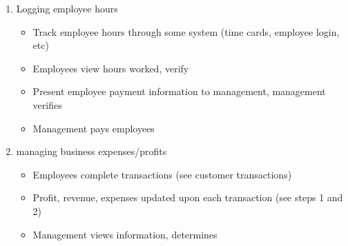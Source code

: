 \documentclass{letter}
\begin{document}
\begin{enumerate}
\begin{itemize}
\begin{itemize}
		\end{itemize}
		\item Logging employee hours
		\begin{itemize}
			\item Track employee hours through some system (time cards, employee login, etc)
			\item Employees view hours worked, verify
			\item Present employee payment information to management, management verifies
			\item Management pays employees
		\end{itemize}
		\item managing business expenses/profits
		\begin{itemize}
			\item Employees complete transactions (see customer transactions)
			\item Profit, revenue, expenses updated upon each transaction (see steps 1 and 2)
			\item Management views information, determines 
	\end{itemize}
\end{enumerate}
\end{document}
